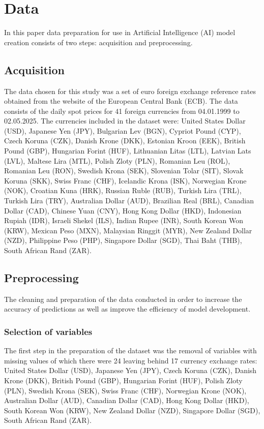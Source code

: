 \section{Data}\label{Data}

In this paper data preparation for use in Artificial Intelligence (AI) model creation consists of two steps: acquisition and preprocessing.

\subsection{Acquisition}\label{Acquisition}

The data chosen for this study was a set of euro foreign exchange reference rates obtained from the website of the European Central Bank (ECB). The data consists of the daily spot prices for 41 foreign currencies from 04.01.1999 to 02.05.2025. The currencies included in the dataset were: United States Dollar (USD), Japanese Yen (JPY), Bulgarian Lev (BGN), Cypriot Pound (CYP), Czech Koruna (CZK), Danish Krone (DKK), Estonian Kroon (EEK), British Pound (GBP), Hungarian Forint (HUF), Lithuanian Litas (LTL), Latvian Lats (LVL), Maltese Lira (MTL), Polish Zloty (PLN), Romanian Leu (ROL), Romanian Leu (RON), Swedish Krona (SEK), Slovenian Tolar (SIT), Slovak Koruna (SKK), Swiss Franc (CHF), Icelandic Krona (ISK), Norwegian Krone (NOK), Croatian Kuna (HRK), Russian Ruble (RUB), Turkish Lira (TRL), Turkish Lira (TRY), Australian Dollar (AUD), Brazilian Real (BRL), Canadian Dollar (CAD), Chinese Yuan (CNY), Hong Kong Dollar (HKD), Indonesian Rupiah (IDR), Israeli Shekel (ILS), Indian Rupee (INR), South Korean Won (KRW), Mexican Peso (MXN), Malaysian Ringgit (MYR), New Zealand Dollar (NZD), Philippine Peso (PHP), Singapore Dollar (SGD), Thai Baht (THB), South African Rand (ZAR).

\subsection{Preprocessing}\label{Preprocessing}

The cleaning and preparation of the data conducted in order to increase the accuracy of predictions as well as improve the efficiency of model development.

\subsubsection{Selection of variables}\label{Selection of variables}

The first step in the preparation of the dataset was the removal of variables with missing values of which there were 24 leaving behind 17 currency exchange rates: United States Dollar (USD), Japanese Yen (JPY), Czech Koruna (CZK), Danish Krone (DKK), British Pound (GBP), Hungarian Forint (HUF), Polish Zloty (PLN), Swedish Krona (SEK), Swiss Franc (CHF), Norwegian Krone (NOK), Australian Dollar (AUD), Canadian Dollar (CAD), Hong Kong Dollar (HKD), South Korean Won (KRW), New Zealand Dollar (NZD), Singapore Dollar (SGD), South African Rand (ZAR).

